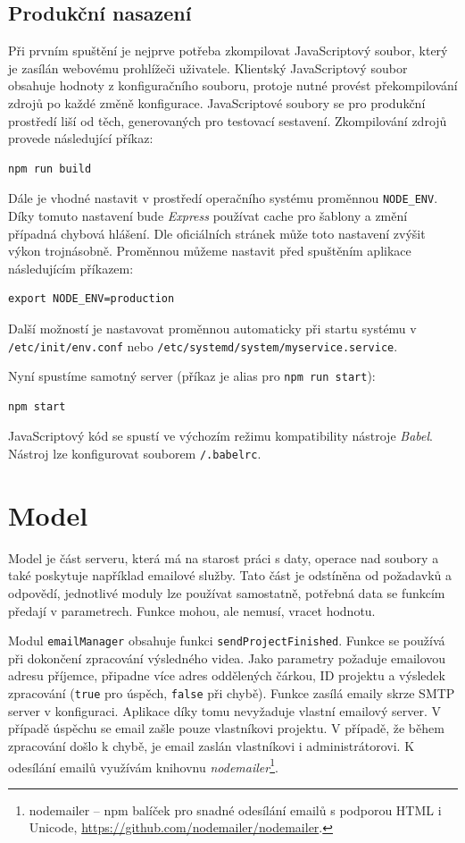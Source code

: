 \subsection{Produkční nasazení}
Při prvním spuštění je nejprve potřeba zkompilovat JavaScriptový soubor, který je zasílán webovému prohlížeči uživatele. Klientský JavaScriptový soubor obsahuje hodnoty z konfiguračního souboru, protoje nutné provést překompilování zdrojů po každé změně konfigurace. JavaScriptové soubory se pro produkční prostředí liší od těch, generovaných pro testovací sestavení. Zkompilování zdrojů provede následující příkaz:
\begin{lstlisting}[style=bash]
npm run build
\end{lstlisting}

Dále je vhodné nastavit v prostředí operačního systému proměnnou \texttt{NODE\_ENV}. Díky tomuto nastavení bude \textit{Express} používat cache pro šablony a změní případná chybová hlášení. Dle oficiálních stránek může toto nastavení zvýšit výkon trojnásobně. Proměnnou můžeme nastavit před spuštěním aplikace následujícím příkazem:
\begin{lstlisting}[style=bash]
export NODE_ENV=production
\end{lstlisting}
Další možností je nastavovat proměnnou automaticky při startu systému v \texttt{/etc/init/env.conf} nebo \texttt{/etc/systemd/system/myservice.service}.\,\cite{express}

Nyní spustíme samotný server (příkaz je alias pro \texttt{npm run start}):
\begin{lstlisting}[style=bash]
npm start
\end{lstlisting}
JavaScriptový kód se spustí ve výchozím režimu kompatibility nástroje \textit{Babel}. Nástroj lze konfigurovat souborem \texttt{/.babelrc}.

\section{Model}
Model je část serveru, která má na starost práci s daty, operace nad soubory a také poskytuje například emailové služby. Tato část je odstíněna od požadavků a odpovědí, jednotlivé moduly lze používat samostatně, potřebná data se funkcím předají v parametrech. Funkce mohou, ale nemusí, vracet hodnotu.

Modul \texttt{emailManager} obsahuje funkci \texttt{sendProjectFinished}. Funkce se používá při dokončení zpracování výsledného videa. Jako parametry požaduje emailovou adresu příjemce, připadne více adres oddělených čárkou, ID projektu a výsledek zpracování (\texttt{true} pro úspěch, \texttt{false} při chybě). Funkce zasílá emaily skrze SMTP server v konfiguraci. Aplikace díky tomu nevyžaduje vlastní emailový server. V případě úspěchu se email zašle pouze vlastníkovi projektu. V případě, že během zpracování došlo k chybě, je email zaslán vlastníkovi i administrátorovi. K odesílání emailů využívám knihovnu \textit{nodemailer}\footnote{nodemailer -- npm balíček pro snadné odesílání emailů s podporou HTML i Unicode, \url{https://github.com/nodemailer/nodemailer}.}.

